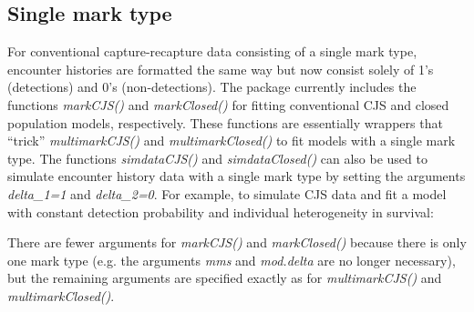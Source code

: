 \documentclass[12pt]{article}
\begin{document}
\subsection{Single mark type}
For conventional capture-recapture data consisting of a single mark type, encounter histories are formatted the same way but now consist solely of 1's (detections) and 0's (non-detections). The package currently includes the functions \textit{markCJS()} and \textit{markClosed()} for fitting conventional CJS and closed population models, respectively. These functions are essentially wrappers that ``trick'' \textit{multimarkCJS()} and \textit{multimarkClosed()} to fit models with a single mark type.  The functions \textit{simdataCJS()} and \textit{simdataClosed()} can also be used to simulate encounter history data with a single mark type by setting the arguments \textit{delta\_1=1} and \textit{delta\_2=0}. For example, to simulate CJS data and fit a model with constant detection probability and individual heterogeneity in survival:
\begin{Schunk}
\end{Schunk}
There are fewer arguments for \textit{markCJS()} and \textit{markClosed()} because there is only one mark type (e.g. the arguments \textit{mms} and \textit{mod.delta} are no longer necessary), but the remaining arguments are specified exactly as for \textit{multimarkCJS()} and \textit{multimarkClosed()}. 
\end{document}
